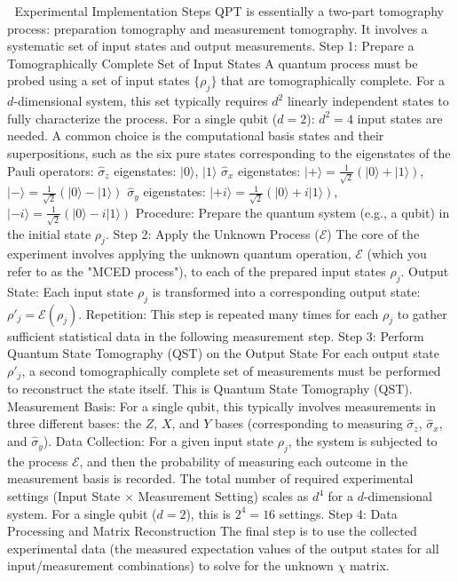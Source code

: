 🔬 Experimental Implementation Steps
QPT is essentially a two-part tomography process: preparation tomography and measurement tomography. It involves a systematic set of input states and output measurements.
Step 1: Prepare a Tomographically Complete Set of Input States
A quantum process must be probed using a set of input states $\{\rho_j\}$ that are tomographically complete. For a $d$-dimensional system, this set typically requires $d^2$ linearly independent states to fully characterize the process.
For a single qubit ($d=2$): $d^2=4$ input states are needed. A common choice is the computational basis states and their superpositions, such as the six pure states corresponding to the eigenstates of the Pauli operators:
$\hat{\sigma}_z$ eigenstates: $|0\rangle$, $|1\rangle$
$\hat{\sigma}_x$ eigenstates: $|+\rangle = \frac{1}{\sqrt{2}}(|0\rangle + |1\rangle)$, $|-\rangle = \frac{1}{\sqrt{2}}(|0\rangle - |1\rangle)$
$\hat{\sigma}_y$ eigenstates: $|+i\rangle = \frac{1}{\sqrt{2}}(|0\rangle + i|1\rangle)$, $|-i\rangle = \frac{1}{\sqrt{2}}(|0\rangle - i|1\rangle)$
Procedure: Prepare the quantum system (e.g., a qubit) in the initial state $\rho_j$.
Step 2: Apply the Unknown Process ($\mathcal{E}$)
The core of the experiment involves applying the unknown quantum operation, $\mathcal{E}$ (which you refer to as the "MCED process"), to each of the prepared input states $\rho_j$.
Output State: Each input state $\rho_j$ is transformed into a corresponding output state: $\rho'_j = \mathcal{E}(\rho_j)$.
Repetition: This step is repeated many times for each $\rho_j$ to gather sufficient statistical data in the following measurement step.
Step 3: Perform Quantum State Tomography (QST) on the Output State
For each output state $\rho'_j$, a second tomographically complete set of measurements must be performed to reconstruct the state itself. This is Quantum State Tomography (QST).
Measurement Basis: For a single qubit, this typically involves measurements in three different bases: the $Z$, $X$, and $Y$ bases (corresponding to measuring $\hat{\sigma}_z$, $\hat{\sigma}_x$, and $\hat{\sigma}_y$).
Data Collection: For a given input state $\rho_j$, the system is subjected to the process $\mathcal{E}$, and then the probability of measuring each outcome in the measurement basis is recorded.
The total number of required experimental settings (Input State $\times$ Measurement Setting) scales as $d^4$ for a $d$-dimensional system. For a single qubit ($d=2$), this is $2^4 = 16$ settings.
Step 4: Data Processing and Matrix Reconstruction
The final step is to use the collected experimental data (the measured expectation values of the output states for all input/measurement combinations) to solve for the unknown $\chi$ matrix.

